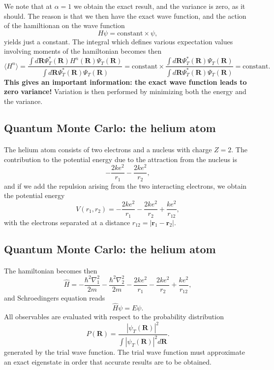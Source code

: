 \documentclass[%
twoside,                 %
final,                   %
10pt]{article}
\begin{document}
We note that at $\alpha=1$ we obtain the exact
result, and the variance is zero, as it should. The reason is that 
we then have the exact wave function, and the action of the hamiltionan
on the wave function
\[
   H\psi = \mathrm{constant}\times \psi,
\]
yields just a constant. The integral which defines various 
expectation values involving moments of the hamiltonian becomes then
\[
   \langle H^n \rangle =
   \frac{\int d\bm{R}\Psi^{\ast}_T(\bm{R})H^n(\bm{R})\Psi_T(\bm{R})}
        {\int d\bm{R}\Psi^{\ast}_T(\bm{R})\Psi_T(\bm{R})}=
\mathrm{constant}\times\frac{\int d\bm{R}\Psi^{\ast}_T(\bm{R})\Psi_T(\bm{R})}
        {\int d\bm{R}\Psi^{\ast}_T(\bm{R})\Psi_T(\bm{R})}=\mathrm{constant}.
\]
\textbf{This gives an important information: the exact wave function leads to zero variance!}
Variation is then performed by minimizing both the energy and the variance.





\subsection*{Quantum Monte Carlo: the helium atom}

\paragraph{}
The helium atom consists of two electrons and a nucleus with
charge $Z=2$. 
The contribution  
to the potential energy due to the attraction from the nucleus is
\[
   -\frac{2ke^2}{r_1}-\frac{2ke^2}{r_2},
\] 
and if we add the repulsion arising from the two 
interacting electrons, we obtain the potential energy
\[
 V(r_1, r_2)=-\frac{2ke^2}{r_1}-\frac{2ke^2}{r_2}+
               \frac{ke^2}{r_{12}},
\]
with the electrons separated at a distance 
$r_{12}=|\bm{r}_1-\bm{r}_2|$.




\subsection*{Quantum Monte Carlo: the helium atom}

\paragraph{}

The hamiltonian becomes then
\[
   \hat{H}=-\frac{\hbar^2\nabla_1^2}{2m}-\frac{\hbar^2\nabla_2^2}{2m}
          -\frac{2ke^2}{r_1}-\frac{2ke^2}{r_2}+
               \frac{ke^2}{r_{12}},
\]
and  Schroedingers equation reads
\[
   \hat{H}\psi=E\psi.
\]
All observables are evaluated with respect to the probability distribution
\[
   P(\bm{R})= \frac{\left|\psi_T(\bm{R})\right|^2}{\int \left|\psi_T(\bm{R})\right|^2d\bm{R}}.
\]
generated by the trial wave function.   
The trial wave function must approximate an exact 
eigenstate in order that accurate results are to be obtained.
\end{document}

